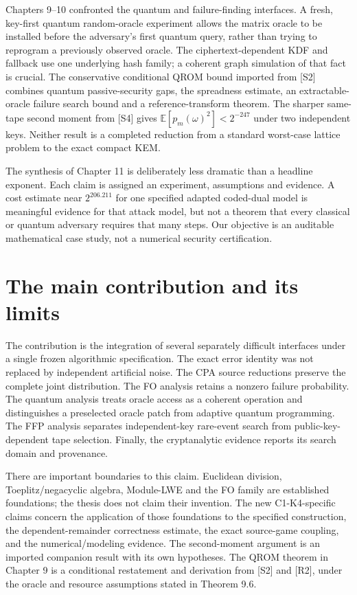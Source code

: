 \documentclass[
  11pt,
  a4paper,
  oneside]{report}
\begin{document}
Chapters 9--10 confronted the quantum and failure-finding interfaces. A
fresh, key-first quantum random-oracle experiment allows the matrix
oracle to be installed before the adversary's first quantum query,
rather than trying to reprogram a previously observed oracle. The
ciphertext-dependent KDF and fallback use one underlying hash family; a
coherent graph simulation of that fact is crucial. The conservative
conditional QROM bound imported from {[}S2{]} combines quantum
passive-security gaps, the spreadness estimate, an extractable-oracle
failure search bound and a reference-transform theorem. The sharper
same-tape second moment from {[}S4{]} gives
\(\mathbb E[p_m(\omega)^2]<2^{-247}\) under two independent keys.
Neither result is a completed reduction from a standard worst-case
lattice problem to the exact compact KEM.

The synthesis of Chapter 11 is deliberately less dramatic than a
headline exponent. Each claim is assigned an experiment, assumptions and
evidence. A cost estimate near \(2^{206.211}\) for one specified adapted
coded-dual model is meaningful evidence for that attack model, but not a
theorem that every classical or quantum adversary requires that many
steps. Our objective is an auditable mathematical case study, not a
numerical security certification.

\section{The main contribution and its
limits}\label{the-main-contribution-and-its-limits}

The contribution is the integration of several separately difficult
interfaces under a single frozen algorithmic specification. The exact
error identity was not replaced by independent artificial noise. The CPA
source reductions preserve the complete joint distribution. The FO
analysis retains a nonzero failure probability. The quantum analysis
treats oracle access as a coherent operation and distinguishes a
preselected oracle patch from adaptive quantum programming. The FFP
analysis separates independent-key rare-event search from
public-key-dependent tape selection. Finally, the cryptanalytic evidence
reports its search domain and provenance.

There are important boundaries to this claim. Euclidean division,
Toeplitz/negacyclic algebra, Module-LWE and the FO family are
established foundations; the thesis does not claim their invention. The
new C1-K4-specific claims concern the application of those foundations
to the specified construction, the dependent-remainder correctness
estimate, the exact source-game coupling, and the numerical/modeling
evidence. The second-moment argument is an imported companion result
with its own hypotheses. The QROM theorem in Chapter 9 is a conditional
restatement and derivation from {[}S2{]} and {[}R2{]}, under the oracle
and resource assumptions stated in Theorem 9.6.
\end{document}
